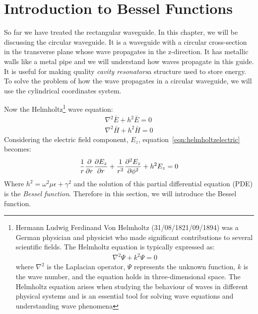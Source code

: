 \chapter{Introduction to Bessel Functions}\label{lec:lec43}
So far we have treated the rectangular waveguide. In this chapter, we will be discussing the circular waveguide. It is a waveguide with a circular cross-section in the transverse plane whose wave propagates in the z-direction. It has metallic walls like a metal pipe and we will understand how waves propagate in this guide. It is useful for making quality \emph{cavity resonators}\textemdash\;a structure used to store energy. To solve the problem of how the wave propagates in a circular waveguide, we will use the cylindrical coordinates system.

Now the Helmholtz\footnote{
Hermann Ludwig Ferdinand Von Helmholtz (31/08/1821/09/1894) was a German physician and physicist who made significant contributions to several scientific fields.  The Helmholtz equation is typically expressed as:
\begin{align*}    
\nabla^2\Psi + k^2\Psi = 0
\end{align*}
where $\nabla^2$ is the Laplacian operator, $\Psi$ represents the unknown function, $k$ is the wave number, and the equation holds in three-dimensional space. The Helmholtz equation arises when studying the behaviour of waves in different physical systems and is an essential tool for solving wave equations and understanding wave phenomena
} wave equation:
\begin{align}
\nabla^2 \bar{E} + h^2 \bar{E} = 0\label{eqn:helmholtzelectric}\\
\nabla^2 \bar{H} + h^2 \bar{H} = 0\label{eqn:helmholtzmagnetic}
\end{align}
Considering the electric field component, $E_z$, equation~\eqref{eqn:helmholtzelectric} becomes:
\begin{align*}
\frac{1}{r} \partialderivative{}{r}\partialderivative{E_z}{r} + \frac{1}{r^2} \partialderivative[2]{E_z}{\phi} + h^2 E_z = 0
\end{align*}
Where $h^2 = \omega^2 \mu \epsilon + \gamma^2$ and the solution of this partial differential equation (PDE) is the \emph{Bessel function}. Therefore in this section, we will introduce the Bessel function.

